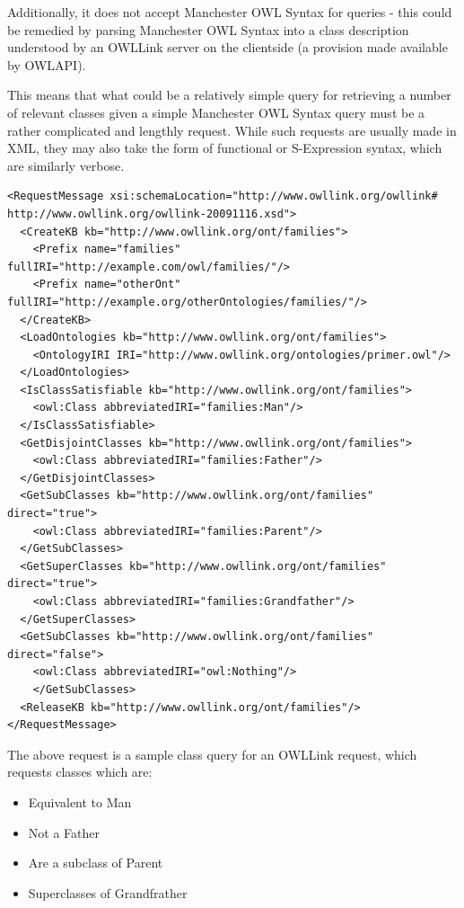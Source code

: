 \documentclass{article}
\begin{document}
Additionally, it does not accept Manchester OWL Syntax for queries - this could 
be remedied by parsing Manchester OWL Syntax into a class description understood 
by an OWLLink server on the clientside (a provision made available by OWLAPI).

This means that what could be a relatively simple query for retrieving a number
of relevant classes given a simple Manchester OWL Syntax query must be a rather
complicated and lengthly request. While such requests are usually made in XML,
they may also take the form of functional or S-Expression syntax, which
are similarly verbose.\cite{owllinkprotocol}

\begin{lstlisting}
<RequestMessage xsi:schemaLocation="http://www.owllink.org/owllink# http://www.owllink.org/owllink-20091116.xsd">
  <CreateKB kb="http://www.owllink.org/ont/families">
    <Prefix name="families" fullIRI="http://example.com/owl/families/"/>
    <Prefix name="otherOnt" fullIRI="http://example.org/otherOntologies/families/"/>
  </CreateKB>
  <LoadOntologies kb="http://www.owllink.org/ont/families">
    <OntologyIRI IRI="http://www.owllink.org/ontologies/primer.owl"/>
  </LoadOntologies>
  <IsClassSatisfiable kb="http://www.owllink.org/ont/families">
    <owl:Class abbreviatedIRI="families:Man"/>
  </IsClassSatisfiable>
  <GetDisjointClasses kb="http://www.owllink.org/ont/families">
    <owl:Class abbreviatedIRI="families:Father"/>
  </GetDisjointClasses>
  <GetSubClasses kb="http://www.owllink.org/ont/families" direct="true">
    <owl:Class abbreviatedIRI="families:Parent"/>
  </GetSubClasses>
  <GetSuperClasses kb="http://www.owllink.org/ont/families" direct="true">
    <owl:Class abbreviatedIRI="families:Grandfather"/>
  </GetSuperClasses>
  <GetSubClasses kb="http://www.owllink.org/ont/families" direct="false">
    <owl:Class abbreviatedIRI="owl:Nothing"/>
    </GetSubClasses>
  <ReleaseKB kb="http://www.owllink.org/ont/families"/>
</RequestMessage>
\end{lstlisting}

The above request is a sample class query for an OWLLink request, which requests
classes which are:

\begin{itemize}
    \item Equivalent to Man
    \item Not a Father
    \item Are a subclass of Parent
    \item Superclasses of Grandfrather
\end{itemize}
\end{document}
